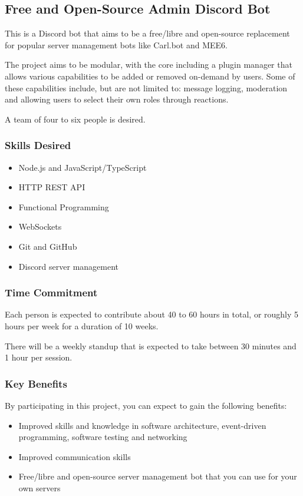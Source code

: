 \subsection{Free and Open-Source Admin Discord Bot}

This is a Discord bot that aims to be a free/libre and open-source replacement for popular server management bots like Carl.bot and MEE6.  

The project aims to be modular, with the core including a plugin manager that allows various capabilities to be added or removed on-demand by users. Some of these capabilities include, but are not limited to: message logging, moderation and allowing users to select their own roles through reactions.

A team of four to six people is desired.

\subsubsection*{Skills Desired}

\begin{multicols}{2}
\begin{itemize}
    \item Node.js and JavaScript/TypeScript
    \item HTTP REST API
    \item Functional Programming
    \item WebSockets
    \item Git and GitHub
    \item Discord server management
\end{itemize}
\end{multicols}

\subsubsection*{Time Commitment}

Each person is expected to contribute about 40 to 60 hours in total, or roughly 5 hours per week for a duration of 10 weeks.

There will be a weekly standup that is expected to take between 30 minutes and 1 hour per session.

\subsubsection*{Key Benefits}

By participating in this project, you can expect to gain the following benefits:

\begin{itemize}
    \item Improved skills and knowledge in software architecture, event-driven programming, software testing and networking
    \item Improved communication skills
    \item Free/libre and open-source server management bot that you can use for your own servers
\end{itemize}
